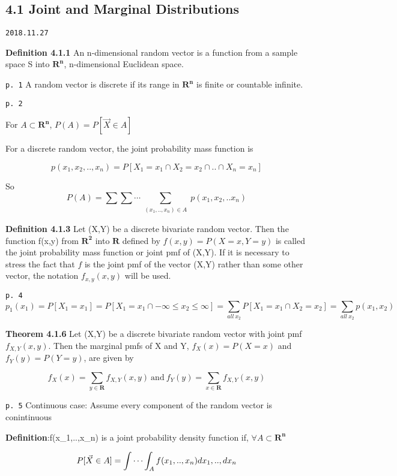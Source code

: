 \documentclass[]{tufte-book}
\begin{document}
\hypertarget{joint-and-marginal-distributions}{%
\subsection{4.1 Joint and Marginal
Distributions}\label{joint-and-marginal-distributions}}

\texttt{2018.11.27}

\textbf{Definition 4.1.1} An n-dimensional random vector is a function
from a sample space S into \(\mathbf{R^n}\), n-dimensional Euclidean
space.

\texttt{p.\ 1} A random vector is discrete if its range in
\(\mathbf{R^n}\) is finite or countable infinite.

\texttt{p.\ 2}

For \(A\subset\mathbf{R^n}\), \(P(A)=P[\vec X\in A]\)

For a discrete random vector, the joint probability mass function is

\[p(x_1,x_2,..,x_n)=P[X_1=x_1\cap X_2=x_2\cap..\cap X_n=x_n]\]

So
\[P(A)=\sum\sum\cdots\sum_{\substack{(x_1,..,x_n)\in A}} p(x_1,x_2,..x_n)\]

\textbf{Definition 4.1.3} Let (X,Y) be a discrete bivariate random
vector. Then the function f(x,y) from \(\mathbf{R^2}\) into
\(\mathbf{R}\) defined by \(f(x,y)=P(X=x,Y=y)\) is called the joint
probability mass function or joint pmf of (X,Y). If it is necessary to
stress the fact that \(f\) is the joint pmf of the vector (X,Y) rather
than some other vector, the notation \(f_{x,y}(x,y)\) will be used.

\texttt{p.\ 4}
\[p_1(x_1)=P[X_1=x_1]=P[X_1=x_1\cap -\infty\le x_2\le \infty]=\sum_{all\ x_2}P[X_1=x_1\cap X_2=x_2]=\sum_{all\ x_2}p(x_1,x_2)\]

\textbf{Theorem 4.1.6} Let (X,Y) be a discrete bivariate random vector
with joint pmf \(f_{X,Y}(x,y)\). Then the marginal pmfs of X and Y,
\(f_X(x)=P(X=x)\) and \(f_Y(y)=P(Y=y)\), are given by

\[f_X(x)=\sum_{y\in\mathbf{R}}f_{X,Y}(x,y)\ \text{and}\ f_Y(y)=\sum_{x\in\mathbf{R}}f_{X,Y}(x,y)\]

\texttt{p.\ 5} Continuous case: Assume every component of the random
vector is conintinuous

\textbf{Definition}:f(x\_1,..,x\_n) is a joint probability density
function if, \(\forall A\subset\mathbf{R^n}\)

\[P[\vec X\in A]=\idotsint_Af(x_1,..,x_n)dx_1,..,dx_n\]
\end{document}
